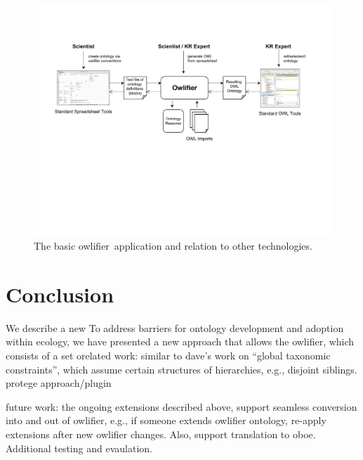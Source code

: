 \documentclass[preprint,number]{elsarticle}
\newcommand{\owlifier}{\textsf{owlifier}}
\begin{document}
\begin{figure}
  \centering
  \includegraphics[scale=.5]{architecture.pdf}
  \caption{The basic \owlifier\ application and relation to other
    technologies.}
  \label{fig:owlifier}
\end{figure}

\section{Conclusion}
\label{sec:conclusion}

We describe a new To address barriers for ontology development and adoption within
ecology, we have presented a new approach that allows the \owlifier,
which consists of a set orelated work: similar to dave's work on
``global taxonomic constraints'', which assume certain structures of
hierarchies, e.g., disjoint siblings. protege approach/plugin

future work: the ongoing extensions described above, support seamless
conversion into and out of owlifier, e.g., if someone extends owlifier
ontology, re-apply extensions after new owlifier changes. Also,
support translation to oboe. Additional testing and evaulation.



%


\end{document}
